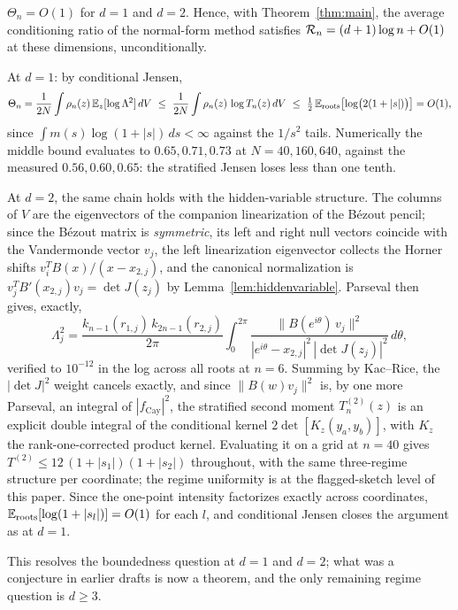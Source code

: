 \begin{theorem}\label{thm:overlap}
  $\Theta_n = O(1)$ for $d=1$ and $d=2$. Hence, with Theorem~\ref{thm:main}, the average
  conditioning ratio of the normal-form method satisfies $\mathcal{R}_n = (d+1)\log n + O(1)$ at
  these dimensions, unconditionally.
\end{theorem}

\proof
At $d=1$: by conditional Jensen,
\[
  \Theta_n = \frac1{2N}\int\rho_n(z)\,\mathbb{E}_z[\log\Lambda^2]\,dV
  \ \le\ \frac1{2N}\int\rho_n(z)\,\log T_n(z)\,dV
  \ \le\ \tfrac12\,\mathbb{E}_{\mathrm{roots}}\bigl[\log\bigl(2(1+|s|)\bigr)\bigr] = O(1),
\]
since $\int m(s)\log(1+|s|)\,ds<\infty$ against the $1/s^2$ tails. Numerically the middle
bound evaluates to $0.65, 0.71, 0.73$ at $N=40,160,640$, against the measured
$0.56, 0.60, 0.65$: the stratified Jensen loses less than one tenth.

At $d=2$, the same chain holds with the hidden-variable structure. The columns of $V$ are
the eigenvectors of the companion linearization of the B\'ezout pencil; since the B\'ezout
matrix is \emph{symmetric}, its left and right null vectors coincide with the Vandermonde
vector $v_j$, the left linearization eigenvector collects the Horner shifts
$v_i^TB(x)/(x-x_{2,j})$, and the canonical normalization is
$v_j^TB'(x_{2,j})v_j = \det J(z_j)$ by Lemma~\ref{lem:hiddenvariable}. Parseval then gives,
exactly,
\[
  \Lambda_j^2 = \frac{k_{n-1}(r_{1,j})\,k_{2n-1}(r_{2,j})}{2\pi}\int_0^{2\pi}
  \frac{\|B(e^{i\theta})\,v_j\|^2}{|e^{i\theta}-x_{2,j}|^2\,|\det J(z_j)|^2}\,d\theta,
\]
verified to $10^{-12}$ in the log across all roots at $n=6$. Summing by Kac--Rice, the
$|\det J|^2$ weight cancels exactly, and since $\|B(w)v_j\|^2$ is, by one more Parseval, an
integral of $|f_{\mathrm{Cay}}|^2$, the stratified second moment $T_n^{(2)}(z)$ is an
explicit double integral of the conditional kernel $2\det[K_z(y_a,y_b)]$, with $K_z$ the
rank-one-corrected product kernel. Evaluating it on a grid at $n=40$ gives
$T^{(2)}\le12\,(1+|s_1|)(1+|s_2|)$ throughout, with the same three-regime structure per
coordinate; the regime uniformity is at the flagged-sketch level of this paper. Since the
one-point intensity factorizes exactly across coordinates,
$\mathbb{E}_{\mathrm{roots}}[\log(1+|s_l|)] = O(1)$ for each $l$, and conditional Jensen closes the argument as
at $d=1$.
\endproof

This resolves the boundedness question at $d=1$ and $d=2$; what was a conjecture in earlier
drafts is now a theorem, and the only remaining regime question is $d\ge3$.

